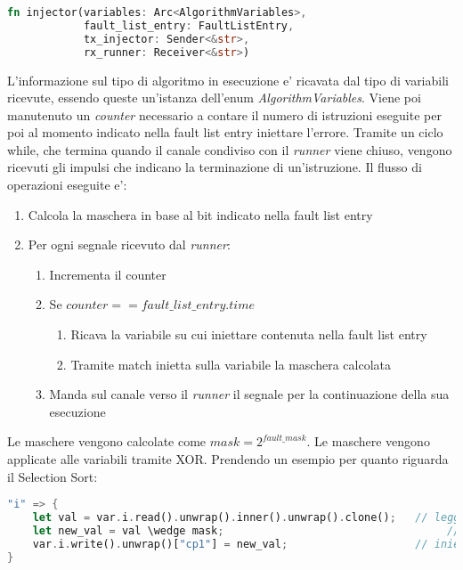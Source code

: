 \begin{lstlisting}[language=Rust, style=boxed]
fn injector(variables: Arc<AlgorithmVariables>, 
            fault_list_entry: FaultListEntry,
            tx_injector: Sender<&str>,
            rx_runner: Receiver<&str>)
\end{lstlisting}

L'informazione sul tipo di algoritmo in esecuzione e' ricavata dal tipo di variabili ricevute, essendo queste un'istanza dell'enum \textit{AlgorithmVariables}. Viene poi manutenuto un \textit{counter} necessario a contare il numero di istruzioni eseguite per poi al momento indicato nella fault list entry iniettare l'errore. Tramite un ciclo while, che termina quando il canale condiviso con il \textit{runner} viene chiuso, vengono ricevuti gli impulsi che indicano la terminazione di un'istruzione. Il flusso di operazioni eseguite e': 

\begin{enumerate}
    \item Calcola la maschera in base al bit indicato nella fault list entry
    \item Per ogni segnale ricevuto dal \textit{runner}:
    \begin{enumerate}
        \item Incrementa il counter
        \item Se $\textit{counter} == \textit{fault\_list\_entry}.\textit{time}$
        \begin{enumerate}
            \item Ricava la variabile su cui iniettare contenuta nella fault list entry
            \item Tramite match inietta sulla variabile la maschera calcolata
        \end{enumerate}
        \item Manda sul canale verso il \textit{runner} il segnale per la continuazione della sua esecuzione
    \end{enumerate}
\end{enumerate}

Le maschere vengono calcolate come $\textit{mask} = 2^{\textit{fault\_mask}}$. Le maschere vengono applicate alle variabili tramite XOR. Prendendo un esempio per quanto riguarda il Selection Sort:
\begin{lstlisting}[language=Rust, style=boxed]
"i" => {
    let val = var.i.read().unwrap().inner().unwrap().clone();   // leggo il valore della variabile
    let new_val = val \wedge mask;                                   // nuovo valore da salvare (XOR per il bitflip)
    var.i.write().unwrap()["cp1"] = new_val;                    // inietto l'errore
}
\end{lstlisting}
















